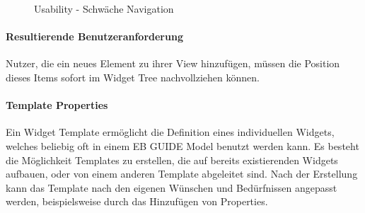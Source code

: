 \begin{figure}[H]
  \centering
  \qquad
  \caption{Usability - Schwäche Navigation}%
  \label{fig:Navigation}
\end{figure}

\paragraph{Resultierende Benutzeranforderung}
Nutzer, die ein neues Element zu ihrer View hinzufügen, müssen die Position dieses Items sofort im Widget Tree nachvollziehen können.

\paragraph{Template Properties}
Ein Widget Template ermöglicht die Definition eines individuellen Widgets, welches beliebig oft in einem EB GUIDE Model benutzt werden kann.
Es besteht die Möglichkeit Templates zu erstellen, die auf bereits existierenden Widgets aufbauen, oder von einem anderen Template abgeleitet sind.
Nach der Erstellung kann das Template nach den eigenen Wünschen und Bedürfnissen angepasst werden, beispielsweise durch das Hinzufügen von Properties.

